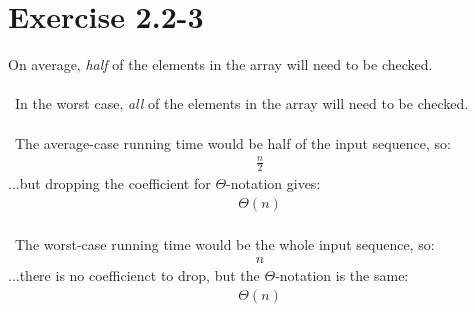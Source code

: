 \documentclass{article}
\begin{document}
\section*{Exercise 2.2-3}

On average, \textit{half} of the elements in the array will need to be checked.
\\ \\
\noindent~In the worst case, \textit{all} of the elements in the array will need to be checked.
\\ \\
\noindent~The average-case running time would be half of the input sequence, so:
\begin{eqnarray*}
	\frac{n}{2}
\end{eqnarray*}
...but dropping the coefficient for $\Theta$-notation gives:
\begin{eqnarray*}
	\Theta(n)
\end{eqnarray*}
\\
\noindent~The worst-case running time would be the whole input sequence, so:
\begin{eqnarray*}
	n
\end{eqnarray*}
...there is no coefficienct to drop, but the $\Theta$-notation is the same:
\begin{eqnarray*}
	\Theta(n)
\end{eqnarray*}
\end{document}
